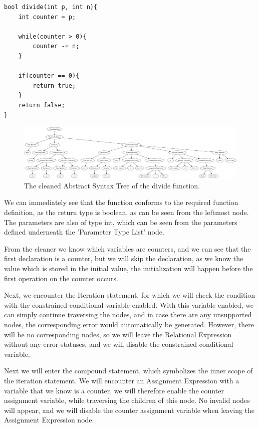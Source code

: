 \documentclass[12pt]{article}
\begin{document}
\begin{lstlisting}[style=CStyle]
bool divide(int p, int n){
	int counter = p;
	
	while(counter > 0){
		counter -= n;
	}
	
	if(counter == 0){
		return true;
	}
	return false;
}
\end{lstlisting}

\begin{figure}[h]
	\centering
	\includegraphics[width=\linewidth]{divide_cleaned}
	\caption{The cleaned Abstract Syntax Tree of the divide function.}
	\label{fig:divide_cleaned}
\end{figure}

We can immediately see that the function conforms to the required function definition, as the return type is boolean, as can be seen from the leftmost node. The parameters are also of type int, which can be seen from the parameters defined underneath the 'Parameter Type List' node.

From the cleaner we know which variables are counters, and we can see that the first declaration is a counter, but we will skip the declaration, as we know the value which is stored in the initial value, the initialization will happen before the first operation on the counter occurs. 

Next, we encounter the Iteration statement, for which we will check the condition with the constrained conditional variable enabled. With this variable enabled, we can simply continue traversing the nodes, and in case there are any unsupported nodes, the corresponding error would automatically be generated. However, there will be no corresponding nodes, so we will leave the Relational Expression without any error statuses, and we will disable the constrained conditional variable. 

Next we will enter the compound statement, which symbolizes the inner scope of the iteration statement. We will encounter an Assignment Expression with a variable that we know is a counter, we will therefore enable the counter assignment variable, while traversing the children of this node. No invalid nodes will appear, and we will disable the counter assignment variable when leaving the Assignment Expression node. 
\end{document}
